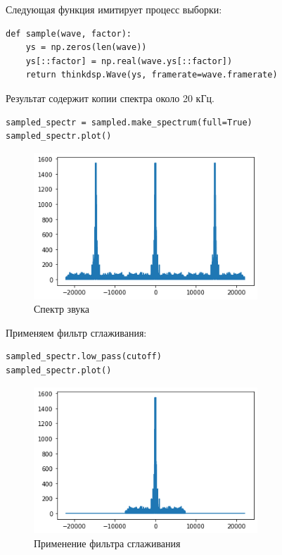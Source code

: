 \documentclass[a4paper,12pt]{report}
\begin{document}
Следующая функция имитирует процесс выборки:

\begin{lstlisting}[caption=Функция \texttt{sample}]
def sample(wave, factor):
    ys = np.zeros(len(wave))
    ys[::factor] = np.real(wave.ys[::factor])
    return thinkdsp.Wave(ys, framerate=wave.framerate) 
\end{lstlisting}

Результат содержит копии спектра около 20 кГц.

\begin{lstlisting}[caption=Спектр звука]
sampled_spectr = sampled.make_spectrum(full=True)
sampled_spectr.plot()
\end{lstlisting}

\begin{figure}[H]
        \centering
        \includegraphics[width=0.75\textwidth]{4.png}
        \caption{Спектр звука}
        \label{4}
\end{figure}

Применяем фильтр сглаживания:

\begin{lstlisting}[caption=Применение фильтра сглаживания]
sampled_spectr.low_pass(cutoff)
sampled_spectr.plot()
\end{lstlisting}

\begin{figure}[H]
        \centering
        \includegraphics[width=0.75\textwidth]{5.png}
        \caption{Применение фильтра сглаживания}
        \label{5}
\end{figure}
\end{document}
